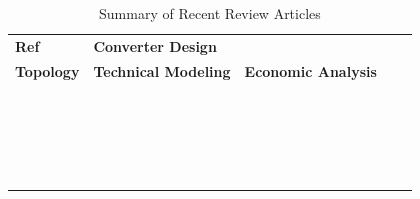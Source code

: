 \documentclass{ieeeaccess}
\newcommand{\cmark}{\ding{51}} %
\newcommand{\xmark}{\ding{55}} %
\begin{document}
\begin{table}[htbp]
\caption{Summary of Recent Review Articles}
\label{research_paper}
\renewcommand{\arrayrulewidth}{1.1pt} %
\renewcommand{\arraystretch}{1.1} %
\centering
\small

\begin{tabular}{|m{0.6cm}<{\centering}|m{1.2cm}<{\centering}|m{1.4cm}<{\centering}|m{1.22cm}<{\centering}|m{1.4cm}<{\centering}|}
\hline
\textbf{Ref} & 
\textbf{Converter Design} & 
\shortstack{\textbf{Connection}\\ \textbf{Topology}} & 
\textbf{Technical Modeling} & 
\textbf{Economic Analysis} \\ 
\hline

\cite{inamdar2018converters} & \cmark & \xmark & \xmark & \xmark \\ \hline
\cite{li2021review} & \cmark & \xmark & \xmark & \xmark \\ \hline
\cite{yu2024dru} & \cmark & \xmark & \xmark & \xmark \\ \hline
\cite{hk2024review} & \cmark & \xmark & \xmark & \xmark \\ \hline
\cite{xu2023eight} & \xmark & \cmark & \xmark & \xmark \\ \hline
\cite{li2020review} & \cmark & \cmark & \xmark & \xmark \\ \hline
\cite{hardy2019techno} & \xmark & \xmark & \xmark & \cmark \\ \hline
\cite{kucuksari2019impact} & \xmark & \xmark & \xmark & \cmark \\ \hline
\cite{fernandez2019offshore} & \xmark & \xmark & \xmark & \cmark \\ \hline
\cite{xiang2021comparison} & \xmark & \xmark & \xmark & \cmark \\ \hline
\cite{houghton2016offshore} & \xmark & \cmark & \xmark & \cmark \\ \hline
\cite{stamatiou2010techno} & \xmark & \cmark & \xmark & \cmark \\ \hline
\cite{bresesti2007hvdc} & \xmark & \cmark & \xmark & \cmark \\ \hline
\cite{sun2021reliability} & \xmark & \cmark & \xmark & \cmark \\ \hline
\cite{meng2021comparative} & \cmark & \xmark & \xmark & \cmark \\ \hline
\cite{saraswati2022offshore} & \xmark & \cmark & \xmark & \cmark \\ \hline
\cite{alassi2019hvdc} & \cmark & \cmark & \xmark & \cmark \\ \hline
\cite{yang2022critical} & \cmark & \cmark & \xmark & \cmark \\ \hline
\cite{deng2023review} & \cmark & \cmark & \cmark & \xmark \\ \hline
\cite{lakshmanan2021electrical} & \cmark & \cmark & \xmark & \cmark \\ \hline

\end{tabular}

\end{table}
\end{document}

